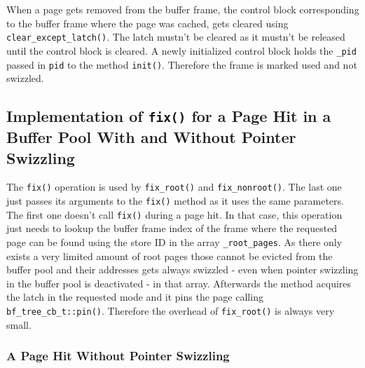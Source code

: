 	When a page gets removed from the buffer frame, the control block corresponding to the buffer frame where the page was cached, gets cleared using \lstinline{clear_except_latch()}. The latch mustn't be cleared as it mustn't be released until the control block is cleared. A newly initialized control block holds the \lstinline{_pid} passed in \lstinline{pid} to the method \lstinline{init()}. Therefore the frame is marked used and not swizzled.

\subsection[Comparison of the Implementations for a Page Hit]{Implementation of \lstinline{fix()} for a Page Hit in a Buffer Pool With and Without Pointer Swizzling} \label{subsec:pagehit}

	The \lstinline{fix()} operation is used by \lstinline{fix_root()} and \lstinline{fix_nonroot()}. The last one just passes its arguments to the \lstinline{fix()} method as it uses the same parameters. The first one doesn't call \lstinline{fix()} during a page hit. In that case, this operation just needs to lookup the buffer frame index of the frame where the requested page can be found using the store ID in the array \lstinline{_root_pages}. As there only exists a very limited amount of root pages those cannot be evicted from the buffer pool and their addresses gets always swizzled - even when pointer swizzling in the buffer pool is deactivated - in that array. Afterwards the method acquires the latch in the requested mode and it pins the page calling \lstinline{bf_tree_cb_t::pin()}. Therefore the overhead of \lstinline{fix_root()} is always very small.

\subsubsection{A Page Hit Without Pointer Swizzling} \label{subsubsec:pagehitwithout}

\begin{@empty}
	\lstset{
		language = [ISO]C++,
		style = basic
	}
	\begin{code}[ht!]
        \vspace{.5em}
		\caption{Implementation of \lstinline{bf_tree_m::fix()} in case of a page hit without having a swizzled page identifier} \label{lst:fixnoswizzlehit}
		
	\end{code}
\end{@empty}


